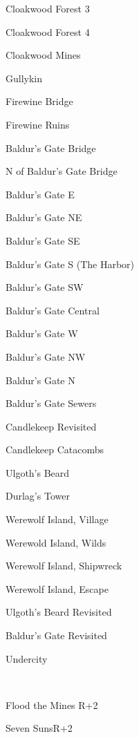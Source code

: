 \documentclass[10pt,a4,twoside]{book}
\begin{document}
\begin{multicols}{3}
\begin{titlepage}
\begin{trivlist}
\item Cloakwood Forest 3
\item Cloakwood Forest 4
\item Cloakwood Mines
\item Gullykin
\item Firewine Bridge
\item Firewine Ruins
\item Baldur's Gate Bridge
\item N of Baldur's Gate Bridge
\item Baldur's Gate E
\item Baldur's Gate NE
\item Baldur's Gate SE
\item Baldur's Gate S (The Harbor)
\item Baldur's Gate SW
\item Baldur's Gate Central
\item Baldur's Gate W
\item Baldur's Gate NW
\item Baldur's Gate N
\item Baldur's Gate Sewers
\item Candlekeep Revisited
\item Candlekeep Catacombs 
\item Ulgoth's Beard
\item Durlag's Tower
\item Werewolf Island, Village
\item Werewold Island, Wilds
\item Werewolf Island, Shipwreck
\item Werewolf Island, Escape
\item Ulgoth's Beard Revisited
\item Baldur's Gate Revisited
\item Undercity
\end{trivlist}

\hrulefill
\\
\begin{trivlist}
\item Flood the Mines \textcolor{OliveGreen}{R+2}
\item Seven Suns\textcolor{OliveGreen}{R+2}


\end{trivlist}
\end{titlepage}
\end{multicols}
\end{document}
